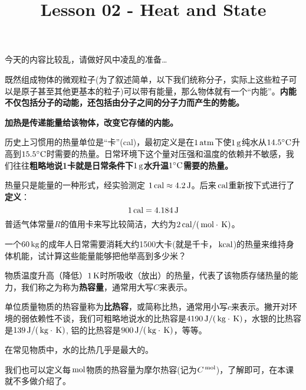 \documentclass[CJK]{beamer}
\title{Lesson 02 - Heat and State}
\author{}
\date{}
\begin{document}

\begin{frame}
\bch
今天的内容比较乱，请做好风中凌乱的准备…
\ech
\end{frame}

\begin{frame}
\bch
\bitem
\item{既然组成物体的微观粒子(为了叙述简单，以下我们统称分子，实际上这些粒子可以是原子甚至其他更基本的粒子)可以带有能量，那么物体就有一个“内能”。{\bf 内能不仅包括分子的动能，还包括由分子之间的分子力而产生的势能。}}
\item{\bf 加热是传递能量给该物体，改变它存储的内能。}
\item{历史上习惯用的热量单位是“卡”(cal)，最初定义是在$1\,\mathrm{atm}$下使$1\,\mathrm{g}$纯水从$14.5^\circ \mathrm{C}$升高到$15.5^\circ \mathrm{C}$时需要的热量。日常环境下这个量对压强和温度的依赖并不敏感，我们往往{\bf 粗略地说1卡就是日常条件下$1\,\mathrm{g}$水升温$1^\circ \mathrm{C}$需要的热量。}}
\item{热量只是能量的一种形式，经实验测定 $1\,\mathrm{cal} \approx 4.2\,\mathrm{J}$。后来$\,\mathrm{cal}$重新按下式进行了{\bf 定义}：
$$1\,\mathrm{cal} = 4.184 \,\mathrm{J}$$
普适气体常量$R$的值用卡来写比较简洁，大约为$2\,\mathrm{cal}/(\,\mathrm{mol}\cdot\,\mathrm{K})$。}
\eitem

\ech
\end{frame}

\begin{frame}
\bch
一个$60\,\mathrm{kg}$的成年人日常需要消耗大约1500大卡(就是千卡，$\,\mathrm{kcal}$)的热量来维持身体机能，试计算这些能量能够把他举高到多少米？
\ech
\end{frame}



\begin{frame}
\bch
\bitem
\item{物质温度升高（降低）$1\,\mathrm{K}$时所吸收（放出）的热量，代表了该物质存储热量的能力，我们称之为称为{\bf 热容量}，通常用大写$C$来表示。}
\item{单位质量物质的热容量称为{\bf 比热容}，或简称比热，通常用小写$c$来表示。撇开对环境的弱依赖性不谈，我们可粗略地说水的比热容是$4190\,\mathrm{J}/(\,\mathrm{kg}\cdot\,\mathrm{K})$，水银的比热容是$139\,\mathrm{J}/(\,\mathrm{kg}\cdot\,\mathrm{K})$, 铝的比热容是$900\,\mathrm{J}/(\,\mathrm{kg}\cdot\,\mathrm{K})$，等等。}
\item{在常见物质中，水的比热几乎是最大的。}
\item{我们也可以定义每$\,\mathrm{mol}$物质的热容量为摩尔热容(记为$C^{\,\mathrm{mol}}$)，了解即可，在本课就不多做介绍了。}
\eitem
\ech
\end{frame}
\end{document}

